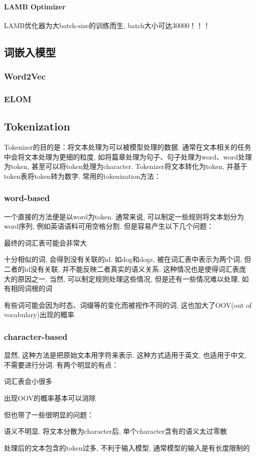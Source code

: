 \paragraph{LAMB Optimizer}
LAMB优化器为大batch-size的训练而生, batch大小可达30000！！！


\subsection{词嵌入模型}
\subsubsection{Word2Vec}

\subsubsection{ELOM}

\subsection{Tokenization}
Tokenizer的目的是：将文本处理为可以被模型处理的数据. 通常在文本相关的任务中会将文本处理为更细的粒度, 如将篇章处理为句子、句子处理为word、word处理为token, 甚至可以将token处理为character. Tokenizer将文本转化为token, 并基于token表将token转为数字. 常用的tokenization方法：
\subsubsection{word-based}
一个直接的方法便是以word为token. 通常来说, 可以制定一些规则将文本划分为word序列, 例如英语语料可用空格分割. 但是容易产生以下几个问题：
\begin{myitemize}
	\item 最终的词汇表可能会非常大
	\item 十分相似的词, 会得到没有关联的id. 如dog和dogs, 被在词汇表中表示为两个词, 但二者的id没有关联, 并不能反映二者真实的语义关系. 这种情况也是使得词汇表庞大的原因之一. 当然, 可以制定规则处理这些情况, 但是还有一些情况难以处理, 如有相同词根的词
	\item 有些词可能会因为时态、词缀等的变化而被视作不同的词, 这也加大了OOV(out of vocabulary)出现的概率	
\end{myitemize}

\subsubsection{character-based}
显然, 这种方法是把原始文本用字符来表示. 这种方式适用于英文, 也适用于中文, 不需要进行分词. 有两个明显的有点：
\begin{myitemize}
	\item 词汇表会小很多
	\item 出现OOV的概率基本可以消除
\end{myitemize}
但也带了一些很明显的问题：
\begin{myitemize}
	\item 语义不明显. 将文本分散为character后, 单个character含有的语义太过零散
	\item 处理后的文本包含的token过多, 不利于输入模型, 通常模型的输入是有长度限制的
\end{myitemize}

